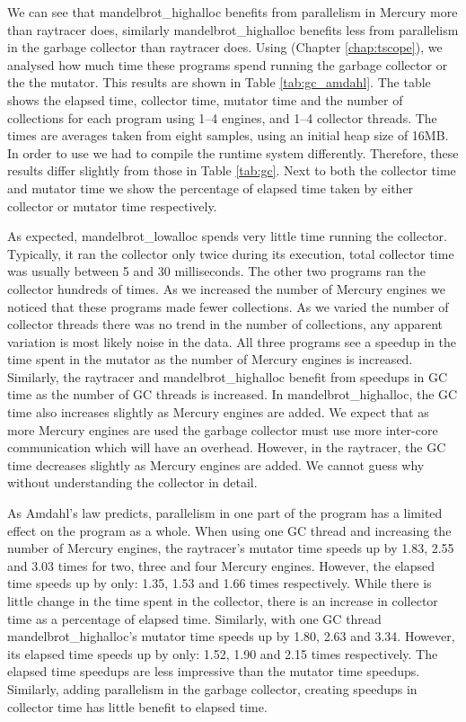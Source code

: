 

We can see that mandelbrot\_highalloc benefits from parallelism in Mercury
more than raytracer does,
similarly mandelbrot\_highalloc benefits less from parallelism in the garbage
collector than raytracer does.
Using \tscope (Chapter \ref{chap:tscope}),
we analysed how much time these programs spend running the garbage collector
or the the mutator.
This results are shown in Table \ref{tab:gc_amdahl}.
The table shows the elapsed time, collector time, mutator time and the
number of collections for each program using 1--4 engines, and 1--4
collector threads.
The times are averages taken from eight samples,
using an initial heap size of 16MB.
In order to use \tscope we had to compile the runtime system differently.
Therefore,
these results differ slightly from those in Table \ref{tab:gc}.
Next to both the collector time and mutator time
we show the percentage of elapsed time taken by either collector or mutator
time respectively.

As expected, mandelbrot\_lowalloc spends very little time running the collector.
Typically, it ran the collector only twice during its execution,
total collector time was usually between 5 and 30 milliseconds.
The other two programs ran the collector hundreds of times.
As we increased the number of Mercury engines
we noticed that these programs made fewer collections.
As we varied the number of collector threads there was no trend in the
number of collections,
any apparent variation is most likely noise in the data.
All three programs see a speedup in the time spent in the mutator as the
number of Mercury engines is increased.
Similarly,
the raytracer and mandelbrot\_highalloc benefit from speedups
in GC time as the number of GC threads is increased.
In mandelbrot\_highalloc,
the GC time also increases slightly as Mercury engines are added.
We expect that as more Mercury engines are used the garbage collector
must use more inter-core communication which will have an overhead.
However, in the raytracer,
the GC time decreases slightly as Mercury engines are added.
We cannot guess why without understanding the collector in detail.

As Amdahl's law predicts,
parallelism in one part of the program has a limited effect on the program
as a whole.
When using one GC thread
and increasing the number of Mercury engines,
the raytracer's mutator time speeds up by 1.83, 2.55 and 3.03 times for
two, three and four Mercury engines.
However, the elapsed time speeds up by only: 1.35, 1.53 and 1.66 times
respectively.
While there is little change in the time spent in the collector,
there is an increase in collector time as a percentage of elapsed time.
Similarly, with one GC thread mandelbrot\_highalloc's mutator time speeds up
by 1.80, 2.63 and 3.34.
However, its elapsed time speeds up by only: 1.52, 1.90 and 2.15 times
respectively.
The elapsed time speedups are less impressive than the mutator time
speedups.
Similarly, adding parallelism in the garbage collector,
creating speedups in collector time has little benefit to elapsed time.


